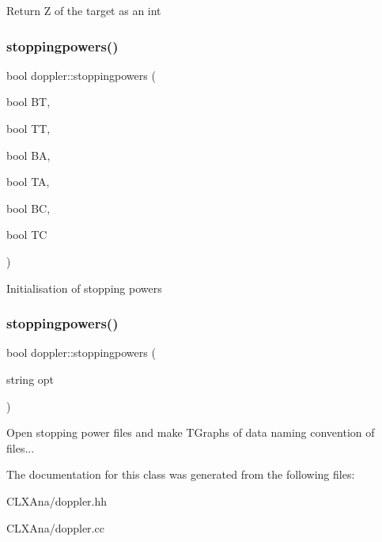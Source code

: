 Return Z of the target as an int \mbox{\label{classdoppler_ad91321c9c9220fff724e5e0982e1a8b8}} 
\subsubsection{\texorpdfstring{stoppingpowers()}{stoppingpowers()}\hspace{0.1cm}{\footnotesize\ttfamily [1/2]}}
{\footnotesize\ttfamily bool doppler\+::stoppingpowers (\begin{DoxyParamCaption}\item[{bool}]{BT,  }\item[{bool}]{TT,  }\item[{bool}]{BA,  }\item[{bool}]{TA,  }\item[{bool}]{BC,  }\item[{bool}]{TC }\end{DoxyParamCaption})}

Initialisation of stopping powers \mbox{\label{classdoppler_a4be762591578e28f8e9d646475ca943a}} 
\subsubsection{\texorpdfstring{stoppingpowers()}{stoppingpowers()}\hspace{0.1cm}{\footnotesize\ttfamily [2/2]}}
{\footnotesize\ttfamily bool doppler\+::stoppingpowers (\begin{DoxyParamCaption}\item[{string}]{opt }\end{DoxyParamCaption})}

Open stopping power files and make T\+Graphs of data naming convention of files... 

The documentation for this class was generated from the following files\+:\begin{DoxyCompactItemize}
\item 
C\+L\+X\+Ana/doppler.\+hh\item 
C\+L\+X\+Ana/doppler.\+cc\end{DoxyCompactItemize}
